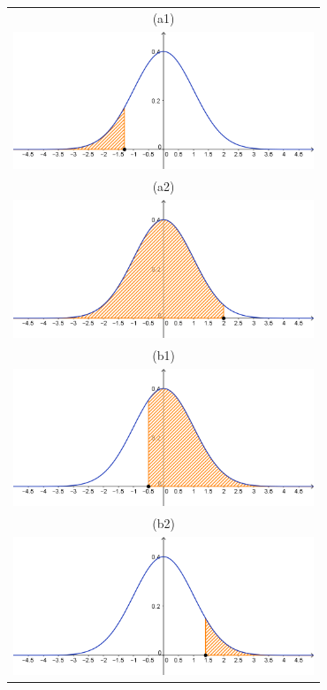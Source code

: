 \begin{figure}[p]
\begin{center}
\begin{enColor}
\begin{tabular}{c}
(a1)\\
\includegraphics[width=9cm]{../fig/Cap06-ColaIzquierdaZ-01.png}\\
(a2)\\
\includegraphics[width=9cm]{../fig/Cap06-ColaIzquierdaZ-02.png}\\
(b1)\\
\includegraphics[width=9cm]{../fig/Cap06-ColaDerechaZ-01.png}\\
(b2)\\
\includegraphics[width=9cm]{../fig/Cap06-ColaDerechaZ-02.png}\\
\end{tabular}

\end{enColor}
\end{center}
\end{figure}
